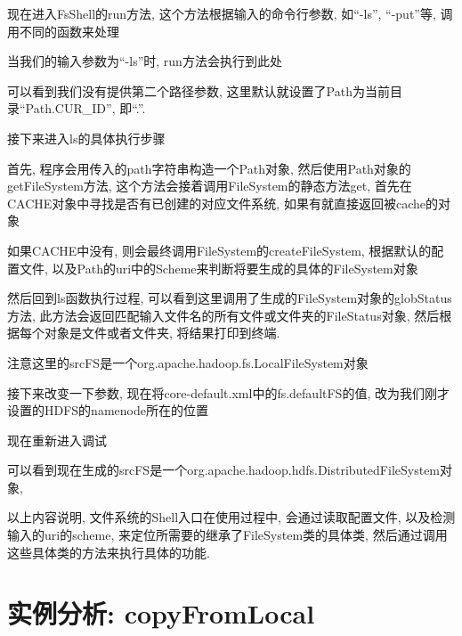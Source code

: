 
现在进入FsShell的run方法, 这个方法根据输入的命令行参数,
如``-ls'', ``-put''等, 调用不同的函数来处理


当我们的输入参数为``-ls''时, run方法会执行到此处


可以看到我们没有提供第二个路径参数,
这里默认就设置了Path为当前目录``Path.CUR\_{}ID'', 即``.''.

接下来进入ls的具体执行步骤


首先, 程序会用传入的path字符串构造一个Path对象, 然后使用Path对象的getFileSystem方法,
这个方法会接着调用FileSystem的静态方法get, 首先在CACHE对象中寻找是否有已创建的对应文件系统,
如果有就直接返回被cache的对象


如果CACHE中没有, 则会最终调用FileSystem的createFileSystem, 根据默认的配置文件,
以及Path的uri中的Scheme来判断将要生成的具体的FileSystem对象


然后回到ls函数执行过程, 可以看到这里调用了生成的FileSystem对象的globStatus方法,
此方法会返回匹配输入文件名的所有文件或文件夹的FileStatus对象, 然后根据每个对象是文件或者文件夹,
将结果打印到终端.

注意这里的srcFS是一个org.apache.hadoop.fs.LocalFileSystem对象


接下来改变一下参数, 现在将core-default.xml中的fs.defaultFS的值,
改为我们刚才设置的HDFS的namenode所在的位置


现在重新进入调试


可以看到现在生成的srcFS是一个org.apache.hadoop.hdfs.DistributedFileSystem对象,

以上内容说明, {\Hadoop}文件系统的Shell入口在使用过程中, 会通过读取配置文件,
以及检测输入的uri的scheme, 来定位所需要的继承了FileSystem类的具体类,
然后通过调用这些具体类的方法来执行具体的功能.

\section{实例分析: copyFromLocal}
\label{sec:env:cfl}

